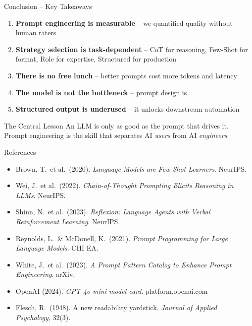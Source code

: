 \documentclass[aspectratio=169, 12pt]{beamer}
\begin{document}
\begin{frame}{Conclusion -- Key Takeaways}
  \begin{enumerate}
    \setlength\itemsep{0.7em}
    \item \textbf{Prompt engineering is measurable} -- we quantified quality without human raters
    \item \textbf{Strategy selection is task-dependent} -- CoT for reasoning, Few-Shot for format,
          Role for expertise, Structured for production
    \item \textbf{There is no free lunch} -- better prompts cost more tokens and latency
    \item \textbf{The model is not the bottleneck} -- prompt design is
    \item \textbf{Structured output is underused} -- it unlocks downstream automation
  \end{enumerate}
  \vspace{1em}
  \begin{alertblock}{The Central Lesson}
    An LLM is only as good as the prompt that drives it. Prompt engineering is the
    skill that separates AI \emph{users} from AI \emph{engineers}.
  \end{alertblock}
\end{frame}

\begin{frame}{References}
  \small
  \begin{itemize}
    \item Brown, T.\ et al.\ (2020). \textit{Language Models are Few-Shot Learners}. NeurIPS.
    \item Wei, J.\ et al.\ (2022). \textit{Chain-of-Thought Prompting Elicits Reasoning in LLMs}. NeurIPS.
    \item Shinn, N.\ et al.\ (2023). \textit{Reflexion: Language Agents with Verbal Reinforcement
          Learning}. NeurIPS.
    \item Reynolds, L.\ \& McDonell, K.\ (2021). \textit{Prompt Programming for Large Language
          Models}. CHI EA.
    \item White, J.\ et al.\ (2023). \textit{A Prompt Pattern Catalog to Enhance Prompt
          Engineering}. arXiv.
    \item OpenAI (2024). \textit{GPT-4o mini model card}. platform.openai.com
    \item Flesch, R.\ (1948). A new readability yardstick. \textit{Journal of Applied
          Psychology}, 32(3).
  \end{itemize}
\end{frame}
\end{document}
